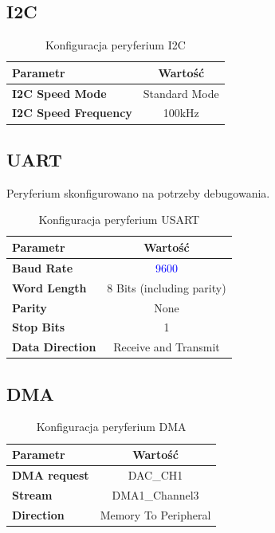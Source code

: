 \documentclass[10pt, a4paper]{article}
\begin{document}
\subsection{I2C}
\begin{table}[H]
	\centering
	\begin{tabular}{|l|c|} \hline
		\textbf{Parametr} & Wartość \\
		\hline
		\hline  \textbf{I2C Speed Mode}&Standard Mode  \\\hline
		\textbf{I2C Speed Frequency} & 100kHz\\
		\hline
	\end{tabular}
	\caption{Konfiguracja peryferium I2C}
	\label{tab:I2C}
\end{table}

\subsection{UART}
Peryferium skonfigurowano na potrzeby debugowania.
\begin{table}[H]
	\centering
	\begin{tabular}{|l|c|} \hline
		\textbf{Parametr} & Wartość \\
		\hline
		\hline  \textbf{Baud Rate}&\textcolor{blue}{9600}\\\hline
		\textbf{Word Length } & 8 Bits (including parity)\\\hline
		\textbf{Parity} &  None\\
		\hline
		\textbf{Stop Bits}& 1\\
		\hline
		\textbf{Data Direction}& Receive and Transmit\\
		\hline
	\end{tabular}
	\caption{Konfiguracja peryferium USART}
	\label{tab:USART}
\end{table}

\subsection{DMA}
\begin{table}[H]
	\centering
	\begin{tabular}{|l|c|} \hline
		\textbf{Parametr} & Wartość \\
		\hline
		\hline  \textbf{DMA request}& DAC\_CH1\\\hline
		\textbf{Stream} & DMA1\_Channel3\\
		\hline
		\textbf{Direction} & Memory To Peripheral\\
		\hline
	\end{tabular}
	\caption{Konfiguracja peryferium DMA}
	\label{tab:DAC}
\end{table}
\end{document}
